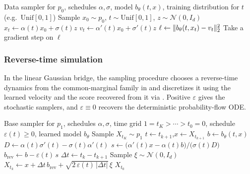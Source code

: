 \begin{algorithm}
  \caption{Bridge regression training for the linear Gaussian bridge}
  \label{alg:bridge-regression-training}
  \begin{algorithmic}[1]
    \Require Data sampler for \(p_0\), schedules $\alpha,\sigma$, model $b_\theta(t,x)$, training distribution for $t$ (e.g.\ $\mathrm{Unif}[0,1]$)
      \State Sample \(x_0\sim p_0\), $t\sim \mathrm{Unif}[0,1]$, $z\sim\mathcal{N}(0,I_d)$
      \State $x_t \gets \alpha(t)x_0+\sigma(t)z$ 
      \State $v_t \gets \alpha'(t)x_0+\sigma'(t)z$ 
      \State $\ell \gets \lVert b_\theta(t,x_t)-v_t\rVert_2^2$
      \State Take a gradient step on $\ell$
    \EndFor
  \end{algorithmic}
\end{algorithm}

\subsubsection{Reverse-time simulation}

In the linear Gaussian bridge, the sampling procedure chooses a reverse-time dynamics from the common-marginal family in  and discretizes it using the learned velocity and the score recovered from it via .
Positive $\varepsilon$ gives the stochastic samplers, and $\varepsilon\equiv 0$ recovers the deterministic probability-flow ODE.

\begin{algorithm}
  \caption{Sampling by reverse-time dynamics}
  \label{alg:bridge-sampling}
  \begin{algorithmic}[1]
    \Require Base sampler for \(p_1\), schedules $\alpha,\sigma$, time grid $1=t_K>\cdots>t_0=0$, schedule $\varepsilon(t)\ge 0$, learned model $b_\theta$
    \State Sample \(X_{t_K}\sim p_1\)
      \State $t \gets t_{k+1}$,\quad $x \gets X_{t_{k+1}}$
      \State $b \gets b_\theta(t,x)$ 
      \State $D \gets \alpha(t)\sigma'(t)-\sigma(t)\alpha'(t)$
      \State $s \gets \bigl(\alpha'(t)x-\alpha(t)b\bigr)\big/\bigl(\sigma(t)D\bigr)$ 
      \State $b_{\mathrm{rev}} \gets b - \varepsilon(t)\,s$
      \State $\Delta t \gets t_k-t_{k+1}$ 
      \State Sample $\xi\sim\mathcal{N}(0,I_d)$
      \State $X_{t_k} \gets x + \Delta t\, b_{\mathrm{rev}} + \sqrt{2\,\varepsilon(t)\,|\Delta t|}\,\xi$ 
    \EndFor
    \State \Return $X_{t_0}$ 
  \end{algorithmic}
\end{algorithm}

